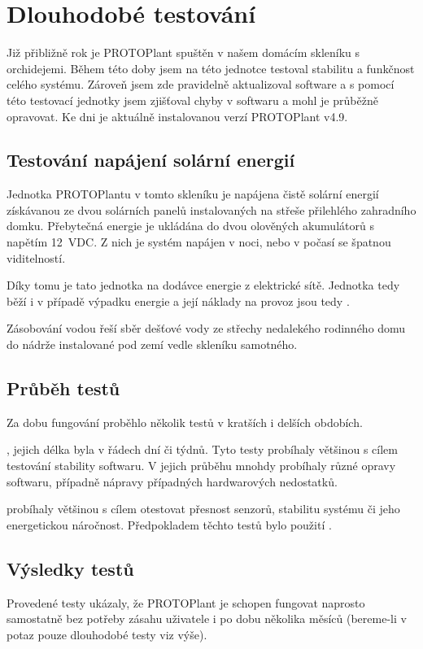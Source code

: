 \chapter{Dlouhodobé testování}
Již přibližně rok je PROTOPlant spuštěn v našem domácím skleníku s orchidejemi.
Během této doby jsem na této jednotce testoval stabilitu a funkčnost celého systému. 
Zároveň jsem zde pravidelně aktualizoval software a s pomocí této testovací jednotky jsem zjišťoval chyby v softwaru a mohl je průběžně opravovat.
Ke dni  je aktuálně instalovanou verzí PROTOPlant v4.9.

\section{Testování napájení solární energií}
\label{sec:SolarPower}
Jednotka PROTOPlantu v tomto skleníku je napájena čistě solární energií získávanou ze dvou solárních panelů instalovaných na střeše přilehlého zahradního domku.
Přebytečná energie je ukládána do dvou olověných akumulátorů s napětím 12~VDC.
Z nich je systém napájen v noci, nebo v počasí se špatnou viditelností.

Díky tomu je tato jednotka  na dodávce energie z elektrické sítě.
Jednotka tedy běží i v případě výpadku energie a její náklady na provoz jsou tedy .

Zásobování vodou řeší sběr dešťové vody ze střechy nedalekého rodinného domu do nádrže instalované pod zemí vedle skleníku samotného.

\section{Průběh testů}
Za dobu fungování proběhlo několik testů v kratších i delších obdobích. \newline

\noindent{}, jejich délka byla v řádech dní či týdnů. 
Tyto testy probíhaly většinou s cílem testování stability softwaru.
V jejich průběhu mnohdy probíhaly různé opravy softwaru, případně nápravy případných hardwarových nedostatků. \newline

\noindent{} probíhaly většinou s cílem otestovat přesnost senzorů, stabilitu systému či jeho energetickou náročnost.
Předpokladem těchto testů bylo použití . 

\section{Výsledky testů}
Provedené testy ukázaly, že PROTOPlant je schopen fungovat naprosto samostatně bez potřeby zásahu uživatele i po dobu několika měsíců (bereme-li v potaz pouze dlouhodobé testy viz výše).

\newpage
